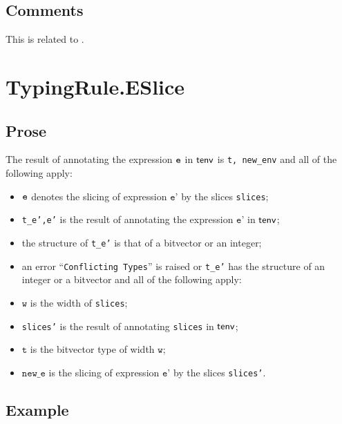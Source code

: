 \documentclass{book}
\newcommand\vt[0]{\texttt{t}}
\newcommand\vw[0]{\texttt{w}}
\newcommand\newe[0]{\texttt{new\_e}}
\newcommand\vep[0]{\texttt{e'}}
\begin{document}
\subsection{Comments}
  This is related to .

\section{TypingRule.ESlice \label{sec:TypingRule.ESlice}}

  \subsection{Prose}
  The result of annotating the expression $\texttt{e}$ in $\textsf{tenv}$ is
\texttt{t, new\_env} and all of the following apply:
  \begin{itemize}
  \item $\texttt{e}$ denotes the slicing of expression $\vep$ by the slices \texttt{slices};
  \item \texttt{t\_e',e'} is the result of annotating the expression $\vep$ in $\textsf{tenv}$;
  \item the structure of \texttt{t\_e'} is that of a bitvector or an integer;
  \item an error ``\texttt{Conflicting Types}'' is raised or \texttt{t\_e'} has the structure of an integer or a bitvector and all of the following apply:
  \item $\vw$ is the width of \texttt{slices};
  \item \texttt{slices'} is the result of annotating \texttt{slices} in $\textsf{tenv}$;
  \item $\vt$ is the bitvector type of width $\vw$;
  \item $\newe$ is the slicing of expression $\vep$ by the slices \texttt{slices'}.
  \end{itemize}

  \subsection{Example}


\end{document}
